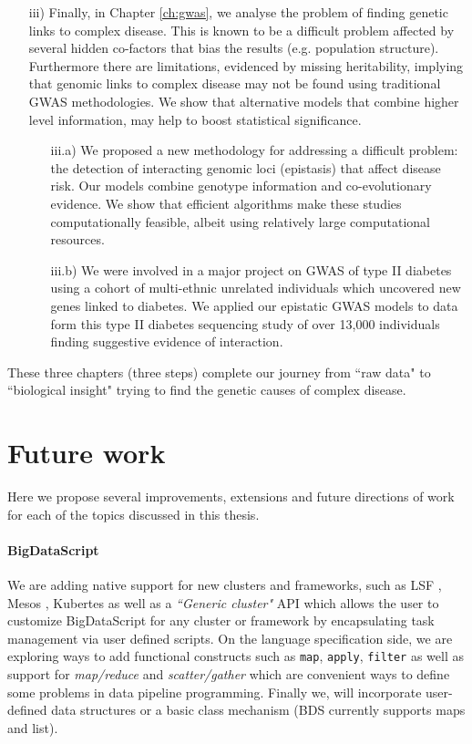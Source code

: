 \begin{itemize}
\item[iii)] Finally, in Chapter \ref{ch:gwas}, we analyse the problem of finding genetic links to complex disease. 
This is known to be a difficult problem affected by several hidden co-factors that bias the results (e.g. population structure). 
Furthermore there are limitations, evidenced by missing heritability, implying that genomic links to complex disease may not be found using traditional GWAS methodologies. 
We show that alternative models that combine higher level information, may help to boost statistical significance. 

	\begin{itemize}
		\item[iii.a)] We proposed a new methodology for addressing a difficult problem: the detection of interacting genomic loci (epistasis) that affect disease risk. 
		Our models combine genotype information and co-evolutionary evidence. We show that efficient algorithms make these studies computationally feasible, albeit using relatively large computational resources.
	
		\item[iii.b)] We were involved in a major project on GWAS of type II diabetes using a cohort of multi-ethnic unrelated individuals which uncovered new genes linked to diabetes. 
		We applied our epistatic GWAS models to data form this type II diabetes sequencing study of over 13,000 individuals finding suggestive evidence of interaction.
			\end{itemize}
	
\end{itemize}

These three chapters (three steps) complete our journey from ``raw data" to ``biological insight" trying to find the genetic causes of complex disease.

\section{Future work}

Here we propose several improvements, extensions and future directions of work for each of the topics discussed in this thesis. \\

\paragraph{BigDataScript}
We are adding native support for new clusters and frameworks, such as LSF \cite{REF}, Mesos \cite{REF}, Kubertes \cite{REF} as well as a \textit{``Generic cluster"} API which allows the user to customize BigDataScript for any cluster or framework by encapsulating task management via user defined scripts. 
On the language specification side, we are exploring ways to add functional constructs such as \texttt{map}, \texttt{apply}, \texttt{filter} as well as support for \textit{map/reduce} and \textit{scatter/gather} which are convenient ways to define some problems in data pipeline programming. 
Finally we, will incorporate user-defined data structures or a basic class mechanism (BDS currently supports maps and list).

